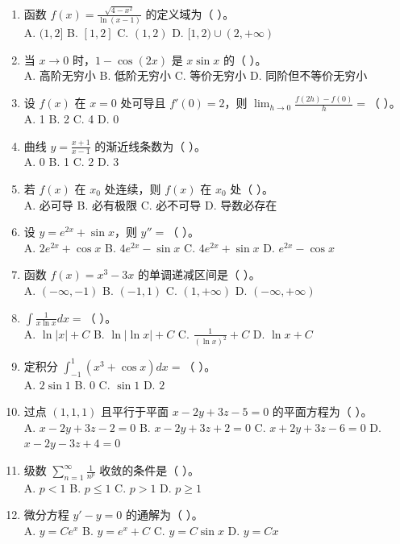 \documentclass[11pt,a4paper]{article}
\begin{document}
\begin{enumerate}
    \item 函数 $f(x) = \frac{\sqrt{4-x^2}}{\ln(x-1)}$ 的定义域为（ ）。 \\
    A. $(1, 2]$ \quad B. $[1, 2]$ \quad C. $(1, 2)$ \quad D. $[1, 2) \cup (2, +\infty)$
    \item 当 $x \to 0$ 时，$1 - \cos(2x)$ 是 $x \sin x$ 的（ ）。 \\
    A. 高阶无穷小 \quad B. 低阶无穷小 \quad C. 等价无穷小 \quad D. 同阶但不等价无穷小
    \item 设 $f(x)$ 在 $x=0$ 处可导且 $f'(0)=2$，则 $\lim_{h \to 0} \frac{f(2h) - f(0)}{h} = $（ ）。 \\
    A. 1 \quad B. 2 \quad C. 4 \quad D. 0
    \item 曲线 $y = \frac{x+1}{x-1}$ 的渐近线条数为（ ）。 \\
    A. 0 \quad B. 1 \quad C. 2 \quad D. 3
    \item 若 $f(x)$ 在 $x_0$ 处连续，则 $f(x)$ 在 $x_0$ 处（ ）。 \\
    A. 必可导 \quad B. 必有极限 \quad C. 必不可导 \quad D. 导数必存在
    \item 设 $y = e^{2x} + \sin x$，则 $y'' = $（ ）。 \\
    A. $2e^{2x} + \cos x$ \quad B. $4e^{2x} - \sin x$ \quad C. $4e^{2x} + \sin x$ \quad D. $e^{2x} - \cos x$
    \item 函数 $f(x) = x^3 - 3x$ 的单调递减区间是（ ）。 \\
    A. $(-\infty, -1)$ \quad B. $(-1, 1)$ \quad C. $(1, +\infty)$ \quad D. $(-\infty, +\infty)$
    \item $\int \frac{1}{x \ln x} dx = $（ ）。 \\
    A. $\ln|x| + C$ \quad B. $\ln|\ln x| + C$ \quad C. $\frac{1}{(\ln x)^2} + C$ \quad D. $\ln x + C$
    \item 定积分 $\int_{-1}^{1} (x^3 + \cos x) dx = $（ ）。 \\
    A. $2\sin 1$ \quad B. 0 \quad C. $\sin 1$ \quad D. $2$
    \item 过点 $(1, 1, 1)$ 且平行于平面 $x - 2y + 3z - 5 = 0$ 的平面方程为（ ）。 \\
    A. $x - 2y + 3z - 2 = 0$ \quad B. $x - 2y + 3z + 2 = 0$ \quad C. $x + 2y + 3z - 6 = 0$ \quad D. $x - 2y - 3z + 4 = 0$
    \item 级数 $\sum_{n=1}^{\infty} \frac{1}{n^p}$ 收敛的条件是（ ）。 \\
    A. $p < 1$ \quad B. $p \le 1$ \quad C. $p > 1$ \quad D. $p \ge 1$
    \item 微分方程 $y' - y = 0$ 的通解为（ ）。 \\
    A. $y = Ce^x$ \quad B. $y = e^x + C$ \quad C. $y = C \sin x$ \quad D. $y = Cx$
\end{enumerate}
\end{document}
